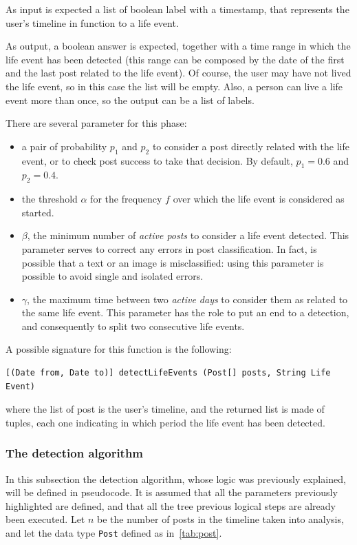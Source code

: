 As input is expected a list of boolean label with a timestamp, that represents the user's timeline in function to a life event.

As output, a boolean answer is expected, together with a time range in which the life event has been detected (this range can be composed by the date of the first and the last post related to the life event). Of course, the user may have not lived the life event, so in this case the list will be empty. Also, a person can live a life event more than once, so the output can be a list of labels.

There are several parameter for this phase: 
\begin{itemize}
\item a pair of probability $p_1$ and $p_2$ to consider a post directly related with the life event, or to check post success to take that decision. By default, $p_1 = 0.6$ and $p_2 = 0.4$.
\item the threshold $\alpha$ for the frequency $f$ over which the life event is considered as started.
\item $\beta$, the minimum number of \textit{active posts} to consider a life event detected. This parameter serves to correct any errors in post classification. In fact, is possible that a text or an image is misclassified: using this parameter is possible to avoid single and isolated errors.
\item $\gamma$, the maximum time between two \textit{active days} to consider them as related to the same life event. This parameter has the role to put an end to a detection, and consequently to split two consecutive life events.
\end{itemize}

A possible signature for this function is the following:
\begin{Verbatim}
[(Date from, Date to)] detectLifeEvents (Post[] posts, String Life Event)
\end{Verbatim}
where the list of post is the user's timeline, and the returned list is made of tuples, each one indicating in which period the life event has been detected.

\subsubsection{The detection algorithm}
\label{sec:computation}

In this subsection the detection algorithm, whose logic was previously explained, will be defined in pseudocode. It is assumed that all the parameters previously highlighted are defined, and that all the tree previous logical steps are already been executed. Let $n$ be the number of posts in the timeline taken into analysis, and let the data type \texttt{Post} defined as in~\ref{tab:post}.

